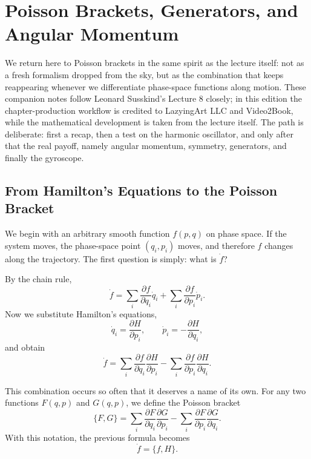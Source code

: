 \chapter{Poisson Brackets, Generators, and Angular Momentum}

We return here to Poisson brackets in the same spirit as the lecture itself: not as a fresh formalism dropped from the sky, but as the combination that keeps reappearing whenever we differentiate phase-space functions along motion. These companion notes follow Leonard Susskind's Lecture 8 closely; in this edition the chapter-production workflow is credited to LazyingArt LLC and Video2Book, while the mathematical development is taken from the lecture itself. The path is deliberate: first a recap, then a test on the harmonic oscillator, and only after that the real payoff, namely angular momentum, symmetry, generators, and finally the gyroscope.

\section{From Hamilton's Equations to the Poisson Bracket}

We begin with an arbitrary smooth function \(f(p,q)\) on phase space. If the system moves, the phase-space point \((q_i,p_i)\) moves, and therefore \(f\) changes along the trajectory. The first question is simply: what is \(\dot f\)?

By the chain rule,
\begin{equation}
\dot f=\sum_i \frac{\partial f}{\partial q_i}\dot q_i+\sum_i \frac{\partial f}{\partial p_i}\dot p_i.
\end{equation}
Now we substitute Hamilton's equations,
\begin{equation}
\dot q_i=\frac{\partial H}{\partial p_i},\qquad \dot p_i=-\frac{\partial H}{\partial q_i},
\end{equation}
and obtain
\begin{equation}
\dot f=\sum_i \frac{\partial f}{\partial q_i}\frac{\partial H}{\partial p_i}
-\sum_i \frac{\partial f}{\partial p_i}\frac{\partial H}{\partial q_i}.
\end{equation}

This combination occurs so often that it deserves a name of its own. For any two functions \(F(q,p)\) and \(G(q,p)\), we define the Poisson bracket
\begin{equation}
\{F,G\}=\sum_i \frac{\partial F}{\partial q_i}\frac{\partial G}{\partial p_i}
-\sum_i \frac{\partial F}{\partial p_i}\frac{\partial G}{\partial q_i}.
\end{equation}
With this notation, the previous formula becomes
\begin{equation}
\dot f=\{f,H\}.
\end{equation}

